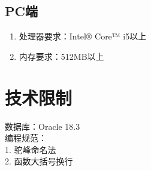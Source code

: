 \subsection{PC端}
	\begin{enumerate}
		\item 处理器要求：Intel® Core™ i5以上
		\item 内存要求：512MB以上 
	\end{enumerate}
\section{技术限制}
\noindent
数据库：Oracle 18.3 \\
编程规范：\\
    1. 驼峰命名法\\
    2. 函数大括号换行\\
